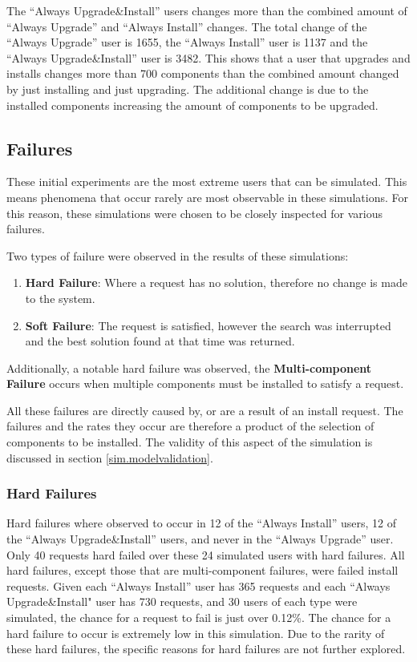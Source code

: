 The ``Always Upgrade\&Install'' users changes more than the combined amount of ``Always Upgrade'' and ``Always Install'' changes.
The total change of the ``Always Upgrade'' user is 1655, the ``Always Install'' user is 1137 and the ``Always Upgrade\&Install'' user is 3482.
This shows that a user that upgrades and installs changes more than 700 components than the combined amount changed by just installing and just upgrading.
The additional change is due to the installed components increasing the amount of components to be upgraded.


\subsection{Failures}
\label{exp.failures}
These initial experiments are the most extreme users that can be simulated.
This means phenomena that occur rarely are most observable in these simulations.
For this reason, these simulations were chosen to be closely inspected for various failures.

Two types of failure were observed in the results of these simulations:
\begin{enumerate}
  \item \textbf{Hard Failure}: Where a request has no solution, therefore no change is made to the system.
  \item \textbf{Soft Failure}: The request is satisfied, however the search was interrupted and the best solution found at that time was returned.
\end{enumerate}
Additionally, a notable hard failure was observed, the \textbf{Multi-component Failure} occurs when multiple components must be installed to satisfy a request. 

All these failures are directly caused by, or are a result of an install request.
The failures and the rates they occur are therefore a product of the selection of components to be installed.
The validity of this aspect of the simulation is discussed in section \ref{sim.modelvalidation}. 

\subsubsection{Hard Failures}
Hard failures where observed to occur in 12 of the ``Always Install'' users, 12 of the ``Always Upgrade\&Install'' users, and never in the ``Always Upgrade'' user.
Only 40 requests hard failed over these 24 simulated users with hard failures.
All hard failures, except those that are multi-component failures, were failed install requests.
Given each ``Always Install'' user has 365 requests and each ``Always Upgrade\&Install" user has 730 requests, 
and 30 users of each type were simulated, the chance for a request to fail is just over 0.12\%.
The chance for a hard failure to occur is extremely low in this simulation.
Due to the rarity of these hard failures, the specific reasons for hard failures are not further explored.

